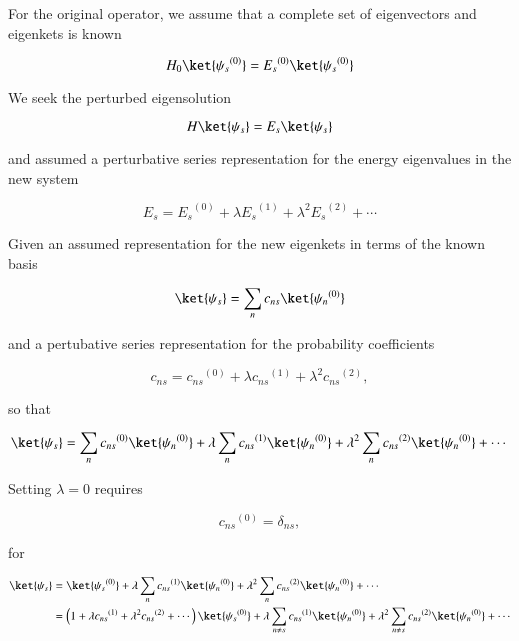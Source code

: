 For the original operator, we assume that a complete set of eigenvectors and eigenkets is known

\begin{equation}\label{eqn:qmTwoL4:30}
H_0 \ket{{\psi_s}^{(0)}} = {E_s}^{(0)} \ket{{\psi_s}^{(0)}}
\end{equation}

We seek the perturbed eigensolution

\begin{equation}\label{eqn:qmTwoL4:50}
H \ket{\psi_s} = E_s \ket{\psi_s}
\end{equation}

and assumed a perturbative series representation for the energy eigenvalues in the new system

\begin{equation}\label{eqn:qmTwoL4:70}
E_s = {E_s}^{(0)} + \lambda {E_s}^{(1)} + \lambda^2 {E_s}^{(2)} + \cdots
\end{equation}

Given an assumed representation for the new eigenkets in terms of the known basis

\begin{equation}\label{eqn:qmTwoL4:90}
\ket{\psi_s} = \sum_n c_{ns} \ket{{\psi_n}^{(0)}} 
\end{equation}

and a pertubative series representation for the probability coefficients

\begin{equation}\label{eqn:qmTwoL4:110}
c_{ns} = {c_{ns}}^{(0)} + \lambda {c_{ns}}^{(1)} + \lambda^2 {c_{ns}}^{(2)},
\end{equation}

so that 

\begin{equation}\label{eqn:qmTwoL4:130}
\ket{\psi_s} = 
\sum_n {c_{ns}}^{(0)} \ket{{\psi_n}^{(0)}} 
+
\lambda
\sum_n {c_{ns}}^{(1)} \ket{{\psi_n}^{(0)}} 
+ 
\lambda^2
\sum_n {c_{ns}}^{(2)} \ket{{\psi_n}^{(0)}} 
+ \cdots
\end{equation}

Setting $\lambda = 0$ requires 

\begin{equation}\label{eqn:qmTwoL4:150}
{c_{ns}}^{(0)} = \delta_{ns},
\end{equation}

for

\begin{equation}\label{eqn:qmTwoL4:170}
\begin{aligned}
\ket{\psi_s} 
&= 
\ket{{\psi_s}^{(0)}} 
+
\lambda
\sum_n {c_{ns}}^{(1)} \ket{{\psi_n}^{(0)}} 
+ 
\lambda^2
\sum_n {c_{ns}}^{(2)} \ket{{\psi_n}^{(0)}} 
+ \cdots \\
&=
\left(
1 
+ \lambda {c_{ns}}^{(1)} 
+ \lambda^2 {c_{ns}}^{(2)} 
+ \cdots
\right)
\ket{{\psi_s}^{(0)}} 
+ 
\lambda
\sum_{n \ne s} {c_{ns}}^{(1)} \ket{{\psi_n}^{(0)}} 
+
\lambda^2
\sum_{n \ne s} {c_{ns}}^{(2)} \ket{{\psi_n}^{(0)}} 
+ \cdots
\end{aligned}
\end{equation}

